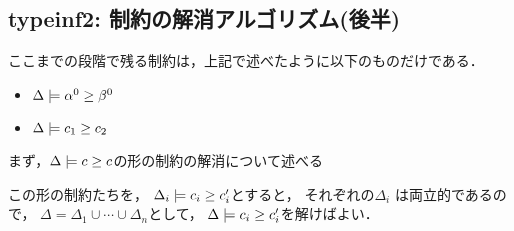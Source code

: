 \subsection{typeinf2: 制約の解消アルゴリズム(後半)}
ここまでの段階で残る制約は，上記で述べたように以下のものだけである．
\begin{itemize}
\item $\Delta \models {\alpha^0} \ge {\beta^0}$
\item $\Delta \models {c_1} \ge {c_2}$
\end{itemize}

まず，$\Delta \models {c} \ge {c}$の形の制約の解消について述べる

この形の制約たちを，
$\Delta_i \models {c_i} \ge {c'_i}$とすると，
それぞれの$\Delta_i$ は両立的であるので，
$\Delta = \Delta_1 \cup \cdots \cup \Delta_n$として，
$\Delta \models {c_i} \ge {c'_i}$を解けばよい．

